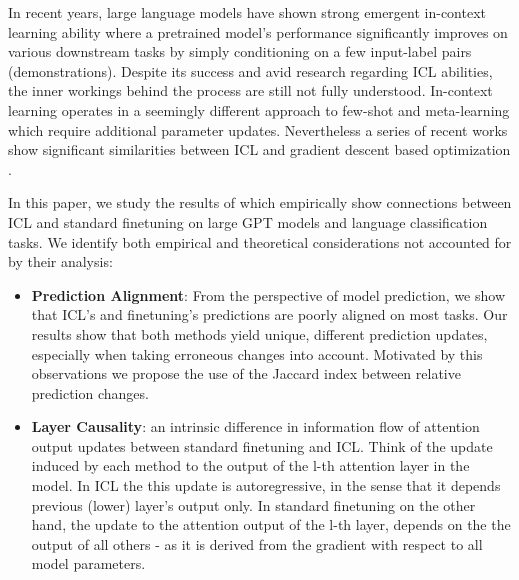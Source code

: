 In recent years, large language models \cite{brown20gpt3} have shown strong emergent in-context learning ability \cite{wei2022emergent} where a pretrained model's performance significantly improves on various downstream tasks by simply conditioning on a few input-label pairs (demonstrations).
Despite its success and avid research regarding ICL abilities, the inner workings behind the process are still not fully understood.
In-context learning operates in a seemingly different approach to few-shot and meta-learning which require additional parameter updates.
Nevertheless a series of recent works show significant similarities between ICL and gradient descent based optimization \cite{irie22dual, pmlr-v202-von-oswald23a, akyürek2023learning}.  

In this paper, we study the results of \cite{dai2023gpt} which empirically show connections between ICL and standard finetuning on large GPT models and language classification tasks.
We identify both empirical and theoretical considerations not accounted for by their analysis:
\begin{itemize}
    \item \textbf{Prediction Alignment}: From the perspective of model prediction, we show that ICL's and finetuning's predictions are poorly aligned on most tasks. 
    Our results show that both methods yield unique, different prediction updates, especially when taking erroneous changes into account.
    Motivated by this observations we propose the use of the Jaccard index between relative prediction changes.    

    \item \textbf{Layer Causality}: an intrinsic difference in information flow of attention output updates between standard finetuning and ICL.
    Think of the update induced by each method to the output of the l-th attention layer in the model.
    In ICL the this update is autoregressive, in the sense that it depends previous (lower) layer's output only.
    In standard finetuning on the other hand, the update to the attention output of the l-th layer, depends on the the output of all others - as it is derived from the gradient with respect to all model parameters.   
    
\end{itemize}
